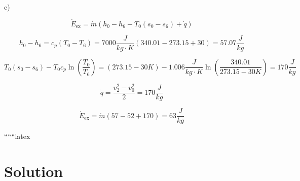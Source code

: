 c)

\[
\dot{E}_{\text{ex}} = \dot{m} (h_0 - h_6 - T_0 (s_0 - s_6) + \dot{q})
\]

\[
h_0 - h_6 = c_p (T_0 - T_6) = 7000 \frac{J}{kg \cdot K} (340.01 - 273.15 + 30) = 57.07 \frac{J}{kg}
\]

\[
T_0 (s_0 - s_6) - T_0 c_p \ln \left( \frac{T_0}{T_6} \right) = (273.15 - 30 K) - 1.006 \frac{J}{kg \cdot K} \ln \left( \frac{340.01}{273.15 - 30 K} \right) = 170 \frac{J}{kg}
\]

\[
\dot{q} = \frac{v_2^2 - v_0^2}{2} = 170 \frac{J}{kg}
\]

\[
\dot{E}_{\text{ex}} = \dot{m} \left( 57 - 52 + 170 \right) = 63 \frac{J}{kg}
\]

``````latex

\section*{Solution}